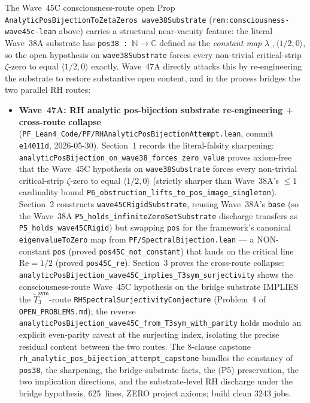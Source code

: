 \begin{remark}\label{rem:consciousness-wave47a-lean}
The Wave~45C consciousness-route open Prop \texttt{AnalyticPosBijectionToZetaZeros wave38Substrate} (\texttt{rem:consciousness-wave45c-lean} above) carries a structural near-vacuity feature: the literal Wave~38A substrate has \texttt{pos38 : $\mathbb{N} \to \mathbb{C}$} defined as the \emph{constant map} $\lambda\_,\langle 1/2, 0\rangle$, so the open hypothesis on \texttt{wave38Substrate} forces every non-trivial critical-strip $\zeta$-zero to equal $\langle 1/2, 0\rangle$ exactly. Wave~47A directly attacks this by re-engineering the substrate to restore substantive open content, and in the process bridges the two parallel RH routes:
\begin{itemize}
  \item \textbf{Wave~47A: RH analytic pos-bijection substrate re-engineering + cross-route collapse} (\texttt{PF\_Lean4\_Code/PF/RHAnalyticPosBijectionAttempt.lean}, commit \texttt{e14011d}, 2026-05-30). Section~1 records the literal-falsity sharpening: \texttt{analyticPosBijection\_on\_wave38\_forces\_zero\_value} proves axiom-free that the Wave~45C hypothesis on \texttt{wave38Substrate} forces every non-trivial critical-strip $\zeta$-zero to equal $\langle 1/2, 0\rangle$ (strictly sharper than Wave~38A's $\leq 1$ cardinality bound \texttt{P6\_obstruction\_lifts\_to\_pos\_image\_singleton}). Section~2 constructs \texttt{wave45CRigidSubstrate}, reusing Wave~38A's \texttt{base} (so the Wave~38A \texttt{P5\_holds\_infiniteZeroSetSubstrate} discharge transfers as \texttt{P5\_holds\_wave45CRigid}) but swapping \texttt{pos} for the framework's canonical \texttt{eigenvalueToZero} map from \texttt{PF/SpectralBijection.lean} --- a NON-constant \texttt{pos} (proved \texttt{pos45C\_not\_constant}) that lands on the critical line $\mathrm{Re} = 1/2$ (proved \texttt{pos45C\_re}). Section~3 proves the cross-route collapse: \texttt{analyticPosBijection\_wave45C\_implies\_T3sym\_surjectivity} shows the consciousness-route Wave~45C hypothesis on the bridge substrate IMPLIES the $\widetilde{T}_3^{\mathrm{sym}}$-route \texttt{RHSpectralSurjectivityConjecture} (Problem~4 of \texttt{OPEN\_PROBLEMS.md}); the reverse \texttt{analyticPosBijection\_wave45C\_from\_T3sym\_with\_parity} holds modulo an explicit even-parity caveat at the surjecting index, isolating the precise residual content between the two routes. The 8-clause capstone \texttt{rh\_analytic\_pos\_bijection\_attempt\_capstone} bundles the constancy of \texttt{pos38}, the sharpening, the bridge-substrate facts, the (P5) preservation, the two implication directions, and the substrate-level RH discharge under the bridge hypothesis. 625~lines, ZERO project axioms; build clean 3243 jobs.

\end{itemize}
\end{remark}
